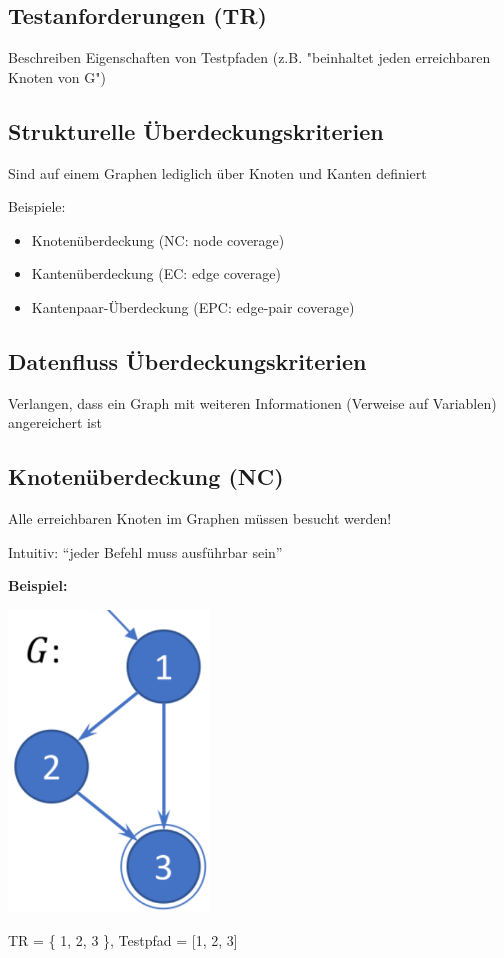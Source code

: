 \documentclass[11pt, a4paper]{article}
\begin{document}
\subsection*{Testanforderungen (TR)}

Beschreiben Eigenschaften von Testpfaden (z.B. "beinhaltet jeden erreichbaren Knoten von G")

\subsection*{Strukturelle Überdeckungskriterien}

Sind auf einem Graphen lediglich über Knoten und Kanten definiert

Beispiele:

\begin{itemize}
    \item Knotenüberdeckung (NC: node coverage)
    \item Kantenüberdeckung (EC: edge coverage)
    \item Kantenpaar-Überdeckung (EPC: edge-pair coverage)
\end{itemize}

\subsection*{Datenfluss Überdeckungskriterien}

Verlangen, dass ein Graph mit weiteren Informationen (Verweise auf Variablen) angereichert ist

\newpage

\subsection{Knotenüberdeckung (NC)}

Alle erreichbaren Knoten im Graphen müssen besucht werden!

Intuitiv: “jeder Befehl muss ausführbar sein”

\vspace{1em}
\textbf{Beispiel:}

\begin{minipage}[h]{0.3\textwidth}
    \centering \includegraphics[width=0.4\textwidth]{Graphen-01.png} 
\end{minipage}
\begin{minipage}[h]{0.6\textwidth}
    TR = \{ 1, 2, 3 \}, Testpfad = [1, 2, 3]
\end{minipage}
\end{document}
